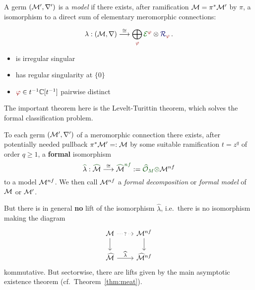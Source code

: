 \begin{defn}\label{defn:model}
  \def\myPhi{\textcolor{red!60!black}{\phi}}
  \def\myE{\textcolor{green!40!black}{\cE^{\myPhi}}}
  A germ $(\mathcal{M}',\nabla')$ is a \emph{model} if there exists, after ramification
  $\mathcal{M}=\pi^*\mathcal{M}'$ by $\pi$, a isomorphism to a direct sum of elementary
  meromorphic connections:
  \begin{multicols}{2}
    \[
      \lambda:(\cM,\nabla)
      \overset{\cong}{\longrightarrow}
      \bigoplus_{~\tikzmark{e3}\!\!\myPhi}
      \overset{\tikzmark{e2}}{\myE}
      \otimes
      \overset{\tikzmark{e1}}{\textcolor{blue!40!black}{\cR_{\myPhi}}}
      \,.
    \]
    \columnbreak{}
    \begin{itemize}
      \item[\tikzmarkb{n2}{green}] is irregular singular
      \item[\tikzmarkc{n1}{blue}] has regular singularity at $\{0\}$
      \item[\tikzmarkc{n3}{red}] $\myPhi\in t^{-1}\C[t^{-1}]$ pairwise distinct
    \end{itemize}
  \end{multicols}

\end{defn}
The important theorem here is the Levelt-Turittin theorem, which solves the
formal classification problem.
\begin{thm}\label{thm:leveltTurittin}
  To each germ $(\mathcal{M}',\nabla')$ of a meromorphic connection there exists, after
  potentially needed pullback $\pi^{*}\textcolor{black}{\mathcal{M}'}=:\mathcal{M}$ by some
  suitable ramification $t=z^q$ of order $q\geq1$, a
  \textcolor{green!30!black}{\textbf{formal}} isomorphism
  \[
    \textcolor{green!30!black}{\hat{\textcolor{black}{\lambda}}}:
    \textcolor{green!30!black}{\hat{\textcolor{black}{\cM}}}
    \overset{\cong}\longrightarrow
    \textcolor{green!30!black}{\hat{\textcolor{black}{\cM}}^{nf}}
    :=\textcolor{green!30!black}{\hat\cO_M\otimes}\cM^{nf}
  \]
  to a model $\mathcal{M}^{nf}$.
  We then call $\mathcal{M}^{nf}$ a \emph{formal decomposition} or \emph{formal model}
  of $\mathcal{M}$ or $\mathcal{M}'$.
  \begin{rem}
    But there is in general \textbf{no} lift of the isomorphism $\hat\lambda$,
    i.e.\ there is no isomorphism making the diagram
    \[ \begin{tikzcd}
        \cM \dar \arrow[dotted]{r}[description]{?} & \cM^{nf} \dar
        \\\hat\cM \rar{\hat\lambda} & \hat\cM^{nf}
    \end{tikzcd} \]
    kommutative.
    But sectorwise, there are lifts given by the main asymptotic existence
    theorem (cf.\ Theorem~\ref{thm:meat}).
  \end{rem}
\end{thm}
